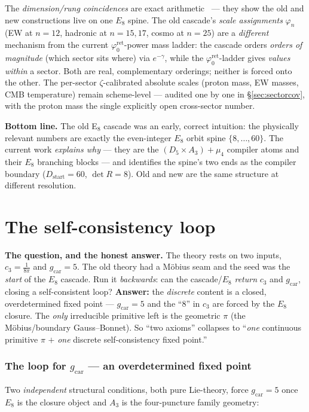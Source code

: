 \documentclass[11pt,a4paper]{article}
\newcommand{\gcar}{g_{\mathrm{car}}}
\newcommand{\cthree}{c_3}
\newcommand{\phiz}{\varphi_0^{\mathrm{ret}}}
\theoremstyle{definition}
\begin{document}
\begin{gapbox}
The \emph{dimension/rung coincidences} are exact arithmetic \mE\ --- they show the old and new
constructions live on one $E_8$ spine. The old cascade's \emph{scale assignments} $\varphi_n$ (EW at
$n{=}12$, hadronic at $n{=}15,17$, cosmo at $n{=}25$) are a \emph{different} mechanism from the current
$\phiz$-power mass ladder: the cascade orders \emph{orders of magnitude} (which sector sits where) via
$e^{-\gamma}$, while the $\phiz$-ladder gives \emph{values within} a sector. Both are real, complementary
orderings; neither is forced onto the other. The per-sector $\zeta$-calibrated absolute scales (proton
mass, EW masses, CMB temperature) remain scheme-level --- audited one by one in
\S\ref{sec:sectorcov}, with the proton mass the single explicitly open cross-sector number.
\end{gapbox}

\noindent\textbf{Bottom line.} The old E$_8$ cascade was an early, correct intuition: the physically
relevant numbers are exactly the even-integer $E_8$ orbit spine $\{8,\dots,60\}$. The current work
\emph{explains why} --- they are the $(D_5\times A_3)+\mu_4$ compiler atoms and their $E_8$ branching
blocks --- and identifies the spine's two ends as the compiler boundary ($D_{\mathrm{start}}=60$,
$\det R=8$). Old and new are the same structure at different resolution.

\clearpage
\part{The self-consistency loop}
\noindent\textbf{The question, and the honest answer.}
The theory rests on two inputs, $\cthree=\tfrac1{8\pi}$ and $\gcar=5$. The old theory had a Möbius seam
and the seed was the \emph{start} of the $E_8$ cascade. Run it \emph{backwards}: can the cascade/$E_8$
\emph{return} $\cthree$ and $\gcar$, closing a self-consistent loop? \textbf{Answer:} the \emph{discrete}
content is a closed, overdetermined fixed point --- $\gcar=5$ and the ``$8$'' in $\cthree$ are forced by
the $E_8$ closure. The \emph{only} irreducible primitive left is the geometric $\pi$ (the Möbius/boundary
Gauss--Bonnet). So ``two axioms'' collapses to ``\emph{one} continuous primitive $\pi$ $+$ \emph{one}
discrete self-consistency fixed point.''

\section{The loop for $\gcar$ --- an overdetermined fixed point}
Two \emph{independent} structural conditions, both pure Lie-theory, force $\gcar=5$ once $E_8$ is the
closure object and $A_3$ is the four-puncture family geometry:
\end{document}
